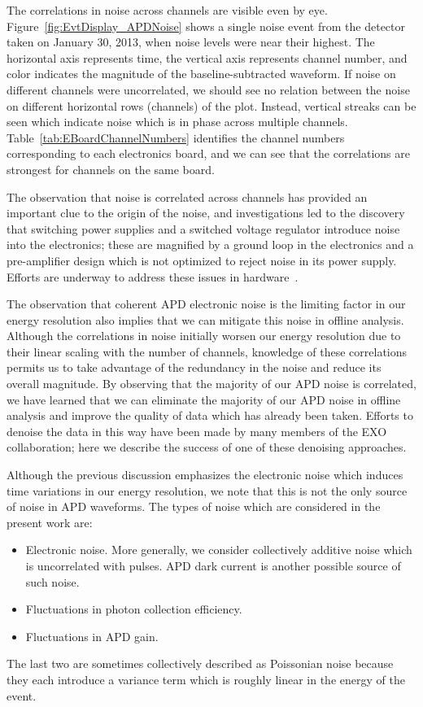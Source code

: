 The correlations in noise across channels are visible even by eye.  Figure~\ref{fig:EvtDisplay_APDNoise} shows a single noise event from the detector taken on January 30, 2013, when noise levels were near their highest.  The horizontal axis represents time, the vertical axis represents channel number, and color indicates the magnitude of the baseline-subtracted waveform.  If noise on different channels were uncorrelated, we should see no relation between the noise on different horizontal rows (channels) of the plot.  Instead, vertical streaks can be seen which indicate noise which is in phase across multiple channels.  Table~\ref{tab:EBoardChannelNumbers} identifies the channel numbers corresponding to each electronics board, and we can see that the correlations are strongest for channels on the same board.

The observation that noise is correlated across channels has provided an important clue to the origin of the noise, and investigations led to the discovery that switching power supplies and a switched voltage regulator introduce noise into the electronics; these are magnified by a ground loop in the electronics and a pre-amplifier design which is not optimized to reject noise in its power supply.  Efforts are underway to address these issues in hardware~\cite{ElectronicsUpgradeReport_Dec2013,ElectronicsUpgradeReport_March2014}.

The observation that coherent APD electronic noise is the limiting factor in our energy resolution also implies that we can mitigate this noise in offline analysis.  Although the correlations in noise initially worsen our energy resolution due to their linear scaling with the number of channels, knowledge of these correlations permits us to take advantage of the redundancy in the noise and reduce its overall magnitude.  By observing that the majority of our APD noise is correlated, we have learned that we can eliminate the majority of our APD noise in offline analysis and improve the quality of data which has already been taken.  Efforts to denoise the data in this way have been made by many members of the EXO collaboration; here we describe the success of one of these denoising approaches.

Although the previous discussion emphasizes the electronic noise which induces time variations in our energy resolution, we note that this is not the only source of noise in APD waveforms.  The types of noise which are considered in the present work are:
\begin{itemize}
\item Electronic noise.  More generally, we consider collectively additive noise which is uncorrelated with pulses.  APD dark current is another possible source of such noise.
\item Fluctuations in photon collection efficiency.
\item Fluctuations in APD gain.
\end{itemize}
The last two are sometimes collectively described as Poissonian noise because they each introduce a variance term which is roughly linear in the energy of the event.

